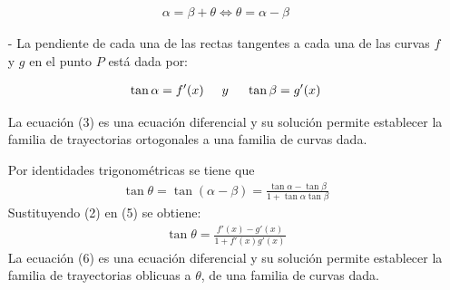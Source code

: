\documentclass[12pt,letterpaper]{article}
\begin{document}
\begin{titlepage}
\begin{flushleft}
\begin{itemize}
\centering
\begin{eqnarray}
\alpha = \beta + \theta \Leftrightarrow \theta = \alpha - \beta
\end{eqnarray}

\item[-] La pendiente de cada una de las rectas tangentes a cada una de las curvas $f$ y $g$ en el punto $P$ está dada por: 

\begin{eqnarray}
\tan \alpha = f'(x) \hspace{0.5cm} y \hspace{0.5cm} \tan \beta = g'(x)
\end{eqnarray}


\begin{flushleft}
La ecuación (3) es una ecuación diferencial y su solución permite establecer la familia de trayectorias ortogonales a una familia de curvas dada.
\end{flushleft}

\begin{flushleft}
Por identidades trigonométricas se tiene que
\begin{eqnarray}
\tan \theta = \tan (\alpha - \beta) = \frac{\tan \alpha - \tan \beta}{1 + \tan \alpha \tan \beta}
\end{eqnarray}
Sustituyendo (2) en (5) se obtiene:
\begin{eqnarray}
\tan \theta = \frac{f'(x)- g'(x)}{1 + f'(x)g'(x)}
\end{eqnarray} 
La ecuación (6) es una ecuación diferencial y su solución permite establecer la familia de trayectorias oblicuas a $\theta$, de una familia de curvas dada.
\end{flushleft} 
\end{itemize}
\end{flushleft}


\end{titlepage}
\end{document}
